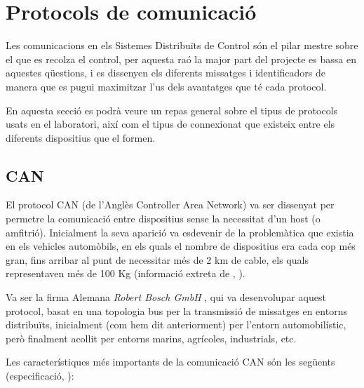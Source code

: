 \section{Protocols de comunicació}\label{cap:tec:prot}

Les comunicacions en els Sistemes Distribuïts de Control són el pilar mestre sobre el que es recolza el control, per aquesta raó la major part del projecte es bassa en aquestes qüestions, i es dissenyen els diferents missatges i identificadors de manera que es pugui maximitzar l'us dels avantatges que té cada protocol. 

En aquesta secció es podrà veure un repas general sobre el tipus de protocols usats en el laboratori, així com el tipus de connexionat que existeix entre els diferents dispositius que el formen.

\subsection{CAN}\label{cap:tec:prot:can}

El protocol CAN (de l'Anglès Controller Area Network) va ser dissenyat per permetre la comunicació entre dispositius sense la necessitat d'un host (o amfitrió). Inicialment la seva aparició va esdevenir de la problemàtica que existia en els vehicles automòbils, en els quals el nombre de dispositius era cada cop més gran, fins arribar al punt de necessitar més de 2 km de cable, els quals representaven més de 100 Kg (informació extreta de \cite{ComIndCAN}, \cite{CapaFisicaCAN}).

Va ser la firma Alemana \emph{Robert Bosch GmbH} , qui va desenvolupar aquest protocol, basat en una topologia bus per la transmissió de missatges en entorns distribuïts, inicialment (com hem dit anteriorment) per l'entorn automobilístic, però finalment acollit per entorns marins, agrícoles, industrials, etc.

Les característiques més importants de la comunicació CAN són les següents (especificació,  \cite{Bosch1991}):

